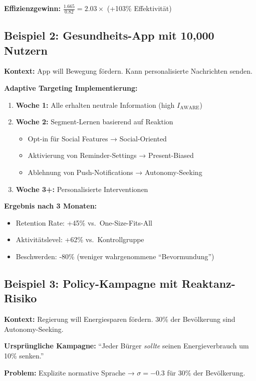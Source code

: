 \textbf{Effizienzgewinn:} $\frac{1.665}{0.82} = 2.03\times$ (+103\% Effektivität)

\subsection{Beispiel 2: Gesundheits-App mit 10,000 Nutzern}

\textbf{Kontext:} App will Bewegung fördern. Kann personalisierte Nachrichten senden.

\textbf{Adaptive Targeting Implementierung:}

\begin{enumerate}
\item \textbf{Woche 1:} Alle erhalten neutrale Information (high $I_{\text{AWARE}}$)
\item \textbf{Woche 2:} Segment-Lernen basierend auf Reaktion
   \begin{itemize}[nosep]
   \item Opt-in für Social Features → Social-Oriented
   \item Aktivierung von Reminder-Settings → Present-Biased
   \item Ablehnung von Push-Notifications → Autonomy-Seeking
   \end{itemize}
\item \textbf{Woche 3+:} Personalisierte Interventionen
\end{enumerate}

\textbf{Ergebnis nach 3 Monaten:}
\begin{itemize}
\item Retention Rate: +45\% vs.\ One-Size-Fits-All
\item Aktivitätslevel: +62\% vs.\ Kontrollgruppe
\item Beschwerden: -80\% (weniger wahrgenommene ``Bevormundung'')
\end{itemize}

\subsection{Beispiel 3: Policy-Kampagne mit Reaktanz-Risiko}

\textbf{Kontext:} Regierung will Energiesparen fördern. 30\% der Bevölkerung sind Autonomy-Seeking.

\textbf{Ursprüngliche Kampagne:} ``Jeder Bürger \textit{sollte} seinen Energieverbrauch um 10\% senken.''

\textbf{Problem:} Explizite normative Sprache → $\sigma = -0.3$ für 30\% der Bevölkerung.


